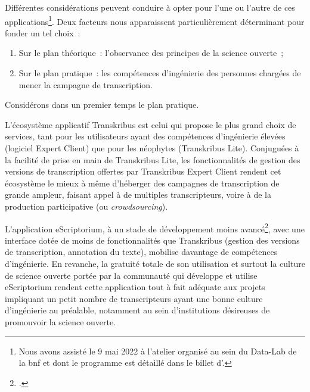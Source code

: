 \documentclass[a4paper,12pt,twoside]{book}
\begin{document}
				Différentes considérations peuvent conduire à opter pour l'une ou l'autre de ces applications\footnote{Nous avons assisté le 9 mai 2022 à l'atelier organisé au sein du Data-Lab de la \gls{bnf} et dont le programme est détaillé dans le billet d'\cite{jacquotTranskribusEScriptoriumTranscrire}.}. Deux facteurs nous apparaissent particulièrement déterminant pour fonder un tel choix~:
				
				\begin{enumerate}
					\item Sur le plan théorique~: l'observance des principes de la science ouverte~;
					\item Sur le plan pratique~: les compétences d'ingénierie des personnes chargées de mener la campagne de transcription.
				\end{enumerate}
				
				Considérons dans un premier temps le plan pratique.
				
				L'écosystème applicatif Transkribus est celui qui propose le plus grand choix de services, tant pour les utilisateurs ayant des compétences d'ingénierie élevées (logiciel Expert Client) que pour les néophytes (Transkribus Lite). Conjuguées à la facilité de prise en main de Transkribus Lite, les fonctionnalités de gestion des versions de transcription offertes par Transkribus Expert Client rendent cet écosystème le mieux à même d'héberger des campagnes de transcription de grande ampleur, faisant appel à de multiples transcripteurs, voire à de la production participative (ou \textit{crowdsourcing}).
				
				L'application eScriptorium, à un stade de développement moins avancé\footcite{stokesEScriptoriumVREManuscript2021}, avec une interface dotée de moins de fonctionnalités que Transkribus (gestion des versions de transcription, annotation du texte), mobilise davantage de compétences d'ingénierie. En revanche, la gratuité totale de son utilisation et surtout la culture de science ouverte portée par la communauté qui développe et utilise eScriptorium rendent cette application tout à fait adéquate aux projets impliquant un petit nombre de transcripteurs ayant une bonne culture d'ingénierie au préalable, notamment au sein d'institutions désireuses de promouvoir la science ouverte.
				
\end{document}
